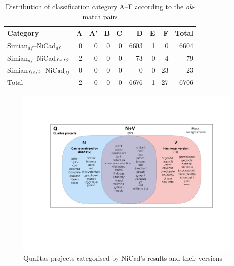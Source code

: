 \documentclass{IEEEtran}
\begin{document}

\begin{table}[H]
	\centering
	\caption{Distribution of classification category A--F  according to the \textit{ok}-match pairs}
	\label{tab:ok_classification_new}
	\begin{tabular}{|l|r|r|r|r|r|r|r|r|}
		\hline 
		Category   																										& A   	& 	A' 	& 	B  & C	   & D   	&	E   &	F   & Total  \\
		\hline
		Simian$_{df}$--NiCad$_{df}$ & 0 & 0	& 0 & 0 & 6603 & 1 & 0 & 6604 \\
		Simian$_{df}$--NiCad$_{\textrm{\textit{fse13}}}$ 
		& 2 	& 0 	& 0 	& 0 	& 73 	 & 0 	  & 4 		&  79 \\
		Simian$_{\textrm{\textit{fse13}}}$--NiCad$_{df}$   									
		& 0 	& 0 	& 0 	& 0 	 & 0 	  & 0 		& 23 	& 23 \\
		\hline
		Total   & 2  	&   0   & 0   	&  0   &   6676   &   1   & 27  & 6706 \\
		\hline
	\end{tabular} 
\end{table}


\begin{figure}
	\centering
	\includegraphics[width=0.7\linewidth]{n+v}
	\caption{Qualitas projects categorised by NiCad's results and their versions}
	\label{fig:n+v}
\end{figure}
\end{document}

